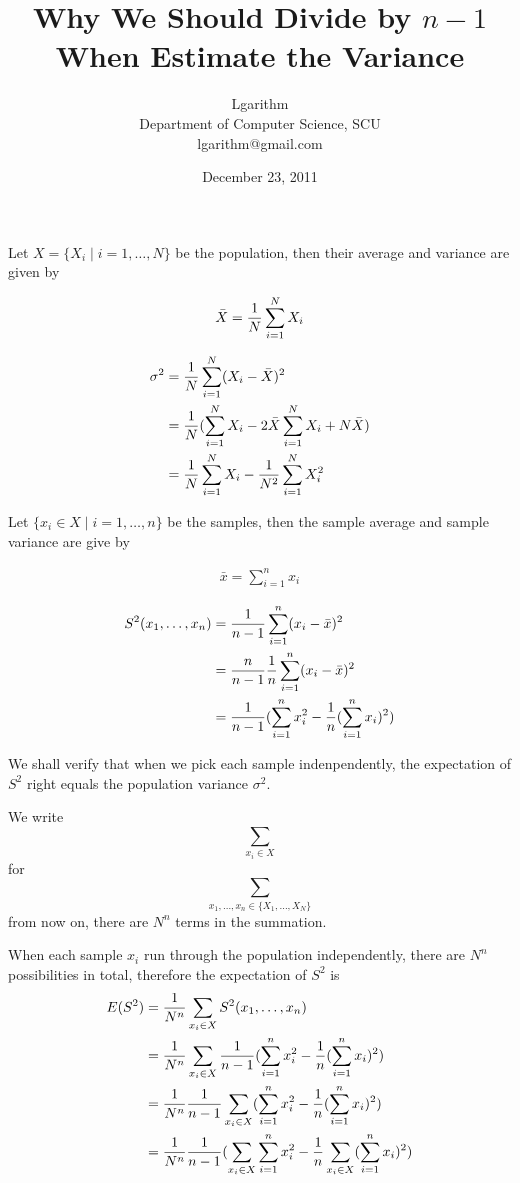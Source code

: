 \documentclass{article}
\title{Why We Should Divide by $n - 1$\\When Estimate the Variance}
\author{Lgarithm\\ Department of Computer Science, SCU \\\mbox{lgarithm@gmail.com}}
\date{December 23, 2011}
\begin{document}
\maketitle

Let $X = \{X_i \mid i = 1, \dots, N \}$ be the population,
then their average and variance are given by

\begin{align}
\bar X = {1 \over N}\sum_{i=1}^N X_i
\end{align}

\begin{align}
\sigma^2
 &= {1 \over N} \sum_{i=1}^N (X_i - \bar X)^2	\nonumber\\
 &= {1 \over N} (\sum_{i=1}^N X_i - 2\bar X\sum_{i=1}^N X_i + N \bar X)	\nonumber\\
 &= {1 \over N} \sum_{i=1}^N X_i - {1 \over N^2} \sum_{i=1}^N X_i^2	
\end{align}

Let $\{x_i \in X \mid i = 1, \dots, n \}$ be the samples,
then the sample average and sample variance are give by

\begin{align}
\bar x = \sum_{i=1}^n x_i
\end{align}

\begin{align}
S^2(x_1, \dots, x_n)
 &= {1 \over n - 1} \sum_{i=1}^n (x_i - \bar x)^2	\nonumber\\
 &= {n \over n - 1} {1 \over n} \sum_{i=1}^n (x_i - \bar x)^2	\nonumber\\
 &= {1 \over n - 1} (\sum_{i=1}^n x_i^2 - {1 \over n}(\sum_{i=1}^n x_i)^2)
\end{align}

We shall verify that when we pick each sample indenpendently,
the expectation of $S^2$ right equals the population variance $\sigma^2$.

We write $$\sum_{x_i \in X}$$ for
$$\sum_{x_1, \dots, x_n \in \{X_1, \dots, X_N\}}$$ from now on,
there are $N^n$ terms in the summation.

When each sample $x_i$ run through the population independently, 
there are $N^n$ possibilities in total,
therefore the expectation of $S^2$ is
\begin{align}
\label{eq:result}
E(S^2)
 &= {1 \over N^n} \sum_{x_i \in X} S^2(x_1, \dots, x_n) \nonumber\\
 &= {1 \over N^n} \sum_{x_i \in X}
		{1 \over n - 1} (\sum_{i=1}^n x_i^2 - {1 \over n}(\sum_{i=1}^n x_i)^2) \nonumber\\
 &= {1 \over N^n} {1 \over n - 1}
		\sum_{x_i \in X}
			(\sum_{i=1}^n x_i^2 - {1 \over n}(\sum_{i=1}^n x_i)^2) \nonumber\\
 &= {1 \over N^n} {1 \over n - 1}
	(\sum_{x_i \in X}
		\sum_{i=1}^n x_i^2
	 -
	 {1 \over n}
	 \sum_{x_i \in X}
		(\sum_{i=1}^n x_i)^2
	)
\end{align}
\end{document}
